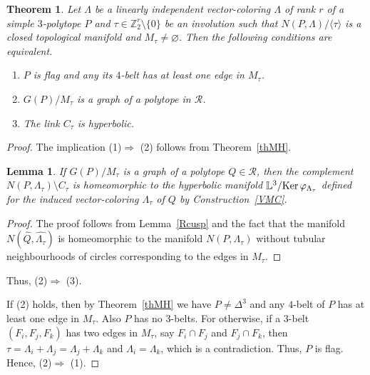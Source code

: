 \documentclass[12pt]{amsart}
\newtheorem{lemma}[formula]{Lemma}
\newtheorem{theorem}[formula]{Theorem}
\theoremstyle{definition}
\theoremstyle{remark}
\begin{document}
\begin{theorem}\label{thHL}
Let $\Lambda$ be a linearly independent vector-coloring $\Lambda$ of rank $r$ of a simple $3$-polytope $P$ 
and $\tau\in\mathbb Z_2^r\setminus\{0\}$ be an involution such that $N(P,\Lambda)/\langle\tau\rangle$
is a closed topological manifold and $M_\tau\ne\varnothing$. Then the following conditions are equivalent.
\begin{enumerate}
\item $P$ is flag and any its $4$-belt has at least one edge in $M_\tau$.
\item  $G(P)/M_\tau$ is a graph of a polytope in $\mathcal{R}$.
\item The link $C_\tau$ is hyperbolic.
\end{enumerate}
\end{theorem}
\begin{proof}
The implication (1)$\Rightarrow$ (2) follows from Theorem~\ref{thMH}.

\begin{lemma}\label{Lcomp}
If $G(P)/M_\tau$ is a graph of a polytope $Q\in \mathcal{R}$, then the complement 
$N(P,\Lambda_\tau)\setminus C_\tau$ is homeomorphic to the hyperbolic manifold 
$\mathbb L^3/{\rm Ker}\,\varphi_{\Lambda_\tau}$
defined for the induced vector-coloring $\Lambda_\tau$ of $Q$ by Construction~\ref{VMC}.
\end{lemma}
\begin{proof}
The proof follows from Lemma~\ref{Rcusp} and the fact that the 
manifold $N(\widehat Q,\widehat{\Lambda_\tau})$ is homeomorphic to the manifold 
$N(P,\Lambda_\tau)$ without tubular neighbourhoods of circles corresponding to the edges in $M_\tau$. 
\end{proof}
Thus, (2)$\Rightarrow$ (3). 

If (2) holds, then by Theorem~\ref{thMH} we have $P\ne\Delta^3$ and any $4$-belt of $P$
has at least one edge in $M_\tau$. Also $P$ has no $3$-belts. For otherwise, if a $3$-belt $(F_i,F_j,F_k)$ has two edges in 
$M_\tau$, say $F_i\cap F_j$ and $F_j\cap F_k$,
then $\tau=\Lambda_i+\Lambda_j=\Lambda_j+\Lambda_k$ and $\Lambda_i=\Lambda_k$, which is a contradiction.
Thus, $P$ is flag. Hence, (2)$\Rightarrow$ (1).


\end{proof}
\end{document}
